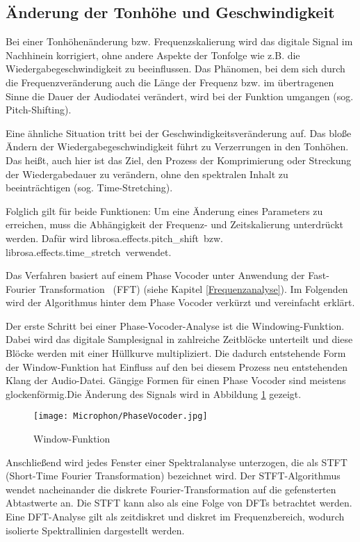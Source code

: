 \subsection{Änderung der Tonhöhe und Geschwindigkeit}


Bei einer Tonhöhenänderung bzw. Frequenzskalierung wird das digitale Signal im Nachhinein korrigiert, ohne andere Aspekte der Tonfolge wie z.B. die Wiedergabegeschwindigkeit zu beeinflussen. 
Das Phänomen, bei dem sich durch die Frequenzveränderung auch die Länge der Frequenz bzw. im übertragenen Sinne die Dauer der Audiodatei verändert, wird bei der Funktion umgangen (sog. Pitch-Shifting).


Eine ähnliche Situation tritt bei der Geschwindigkeitsveränderung auf. Das bloße Ändern der Wiedergabegeschwindigkeit führt zu Verzerrungen in den Tonhöhen. 
Das heißt, auch hier ist das Ziel, den Prozess der Komprimierung oder Streckung der Wiedergabedauer zu verändern, ohne den spektralen Inhalt zu beeinträchtigen (sog. Time-Stretching).

Folglich gilt für beide Funktionen:
Um eine Änderung eines Parameters zu erreichen, muss die Abhängigkeit der Frequenz- und Zeitskalierung unterdrückt werden.
Dafür wird \glqq librosa.effects.pitch\_shift\grqq \ bzw. \glqq librosa.effects.time\_stretch\grqq \ verwendet.

Das Verfahren basiert auf einem Phase Vocoder unter Anwendung der \glqq Fast-Fourier Transformation\grqq~ (FFT) (siehe Kapitel \ref{Frequenzanalyse}). 
Im Folgenden wird der Algorithmus hinter dem Phase Vocoder verkürzt und vereinfacht erklärt.


Der erste Schritt bei einer Phase-Vocoder-Analyse ist die Windowing-Funktion. Dabei wird das digitale Samplesignal in zahlreiche Zeitblöcke unterteilt und diese Blöcke werden mit einer Hüllkurve multipliziert. Die dadurch entstehende Form der Window-Funktion hat Einfluss auf den bei diesem Prozess neu entstehenden Klang der Audio-Datei. 
Gängige Formen für einen Phase Vocoder sind meistens glockenförmig.Die Änderung des Signals wird in Abbildung \ref{fig:Window-Funktion} gezeigt.

\begin{figure}
    \centering
    \texttt{[image: Microphon/PhaseVocoder.jpg]}
    \caption{Window-Funktion}
    \label{fig:Window-Funktion}
\end{figure}

Anschließend wird jedes Fenster einer Spektralanalyse unterzogen, die als STFT (Short-Time Fourier Transformation) bezeichnet wird.
Der STFT-Algorithmus wendet nacheinander die diskrete Fourier-Transformation  auf die gefensterten Abtastwerte an. Die STFT kann also als eine Folge von DFTs betrachtet werden.
Eine DFT-Analyse gilt als zeitdiskret und diskret im Frequenzbereich, wodurch isolierte Spektrallinien dargestellt werden.

